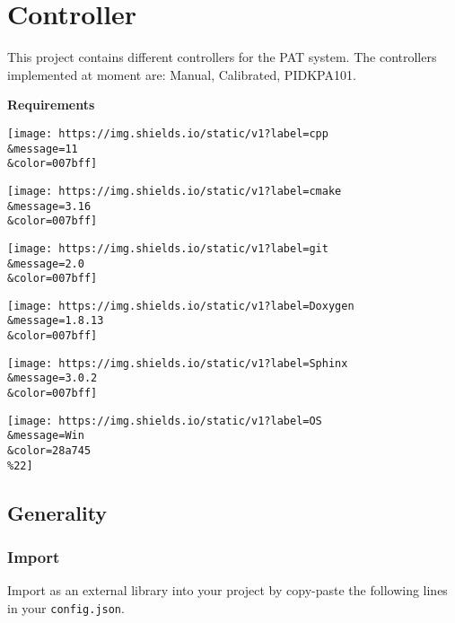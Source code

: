 \hypertarget{controller}{%
\section{Controller}\label{controller}}

This project contains different controllers for the PAT system. The
controllers implemented at moment are: Manual, Calibrated, PIDKPA101.

\textbf{Requirements}

\texttt{[image: https://img.shields.io/static/v1?label=cpp\\\&message=11\\\&color=007bff]}

\texttt{[image: https://img.shields.io/static/v1?label=cmake\\\&message=3.16\\\&color=007bff]}

\texttt{[image: https://img.shields.io/static/v1?label=git\\\&message=2.0\\\&color=007bff]}

\texttt{[image: https://img.shields.io/static/v1?label=Doxygen\\\&message=1.8.13\\\&color=007bff]}

\texttt{[image: https://img.shields.io/static/v1?label=Sphinx\\\&message=3.0.2\\\&color=007bff]}

\texttt{[image: https://img.shields.io/static/v1?label=OS\\\&message=Win\\\&color=28a745\\\%22]}

\hypertarget{generality}{%
\subsection{Generality}\label{generality}}

\hypertarget{import}{%
\subsubsection{Import}\label{import}}

Import as an external library into your project by copy-paste the
following lines in your \texttt{config.json}.

\begin{Shaded}
\begin{Highlighting}[]
\FunctionTok{\{}
       \FunctionTok{:} \FunctionTok{,}
       \FunctionTok{:} \FunctionTok{,}
        \FunctionTok{:} \FunctionTok{,}
  \FunctionTok{:} \FunctionTok{,}
     \FunctionTok{:} 
\FunctionTok{\}}
\end{Highlighting}
\end{Shaded}

